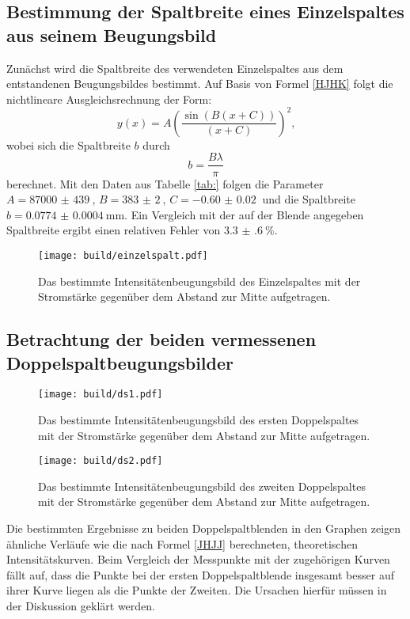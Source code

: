 \subsection{Bestimmung der Spaltbreite eines Einzelspaltes aus seinem Beugungsbild}
Zunächst wird die Spaltbreite des verwendeten Einzelspaltes aus dem entstandenen Beugungsbildes bestimmt.
Auf Basis von Formel \eqref{HJHK} folgt die nichtlineare Ausgleichsrechnung der Form:
\begin{equation}
  y(x) = A \left( \frac{\sin(B (x+C))}{(x+C)}\right)^2 \text{,}
\end{equation}
wobei sich die Spaltbreite $b$ durch
\begin{equation}
  b = \frac{B \lambda}{\pi}
  \end{equation}
  berechnet. Mit den Daten aus Tabelle \ref{tab:} folgen die Parameter $A = \SI{87000(439)}{}$, $B = \SI{383(2)}{}$, $C = \SI{-0.60(2)}{}$ und die Spaltbreite $b = \SI{0.0774(4)}{\milli\meter}$. Ein Vergleich mit der auf der Blende angegeben Spaltbreite ergibt einen relativen Fehler von $\SI{3.3(6)}{\percent}$.
\begin{figure}
 \centering
 \caption{Das bestimmte Intensitätenbeugungsbild des Einzelspaltes mit der Stromstärke gegenüber dem Abstand zur Mitte aufgetragen.}
 \texttt{[image: build/einzelspalt.pdf]}
 \label{fig:einzer}
\end{figure}

\subsection{Betrachtung der beiden vermessenen Doppelspaltbeugungsbilder}
\begin{figure}
 \centering
 \caption{Das bestimmte Intensitätenbeugungsbild des ersten Doppelspaltes mit der Stromstärke gegenüber dem Abstand zur Mitte aufgetragen.}
 \texttt{[image: build/ds1.pdf]}
 \label{fig:dseins}
\end{figure}

\begin{figure}
 \centering
 \caption{Das bestimmte Intensitätenbeugungsbild des zweiten Doppelspaltes mit der Stromstärke gegenüber dem Abstand zur Mitte aufgetragen.}
 \texttt{[image: build/ds2.pdf]}
 \label{fig:dszwei}
\end{figure}

Die bestimmten Ergebnisse zu beiden Doppelspaltblenden in den Graphen zeigen ähnliche Verläufe wie die nach Formel \eqref{JHJJ} berechneten, theoretischen Intensitätskurven. Beim Vergleich der Messpunkte mit der zugehörigen Kurven fällt auf, dass die Punkte bei der ersten Doppelspaltblende insgesamt besser auf ihrer Kurve liegen als die Punkte der Zweiten. Die Ursachen hierfür müssen in der Diskussion geklärt werden.

